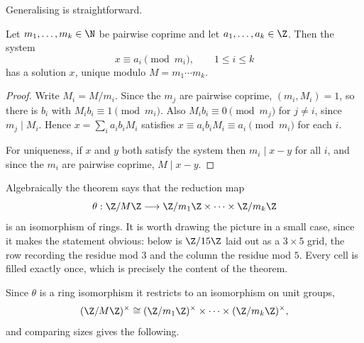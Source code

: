 Generalising is straightforward.

\begin{theorem}\label{thm:crt}
	Let $m_1, \dots, m_k \in \N$ be pairwise coprime and let $a_1, \dots, a_k \in \Z$. Then the system
	$$
	x \equiv a_i \pmod{m_i}, \qquad 1 \leq i \leq k
	$$
	has a solution $x$, unique modulo $M = m_1 \cdots m_k$.
\end{theorem}
\begin{proof}
	Write $M_i = M/m_i$. Since the $m_j$ are pairwise coprime, $(m_i, M_i) = 1$, so there is $b_i$ with $M_i b_i \equiv 1 \pmod{m_i}$. Also $M_i b_i \equiv 0 \pmod{m_j}$ for $j \neq i$, since $m_j \mid M_i$. Hence $x = \sum_i a_i b_i M_i$ satisfies $x \equiv a_i b_i M_i \equiv a_i \pmod{m_i}$ for each $i$.

	For uniqueness, if $x$ and $y$ both satisfy the system then $m_i \mid x - y$ for all $i$, and since the $m_i$ are pairwise coprime, $M \mid x - y$.
\end{proof}

Algebraically the theorem says that the reduction map
$$
\theta : \Z/M\Z \longrightarrow \Z/m_1\Z \times \cdots \times \Z/m_k\Z
$$
is an isomorphism of rings. It is worth drawing the picture in a small case, since it makes the statement obvious: below is $\Z/15\Z$ laid out as a $3 \times 5$ grid, the row recording the residue mod $3$ and the column the residue mod $5$. Every cell is filled exactly once, which is precisely the content of the theorem.

\begin{center}
\end{center}

Since $\theta$ is a ring isomorphism it restricts to an isomorphism on unit groups,
$$
(\Z/M\Z)^\times \cong (\Z/m_1\Z)^\times \times \cdots \times (\Z/m_k\Z)^\times,
$$
and comparing sizes gives the following.

